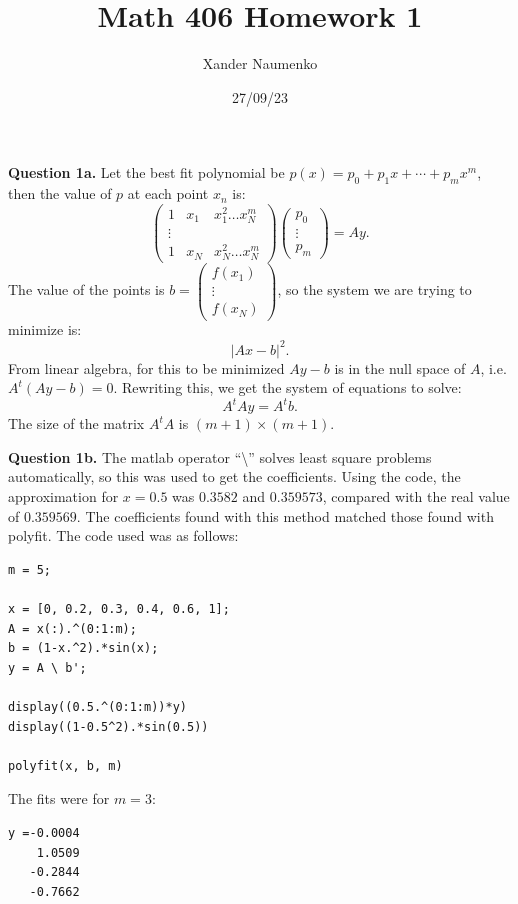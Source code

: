 \documentclass[letterpaper, reqno,11pt]{article}
\begin{document}
\title{Math 406 Homework 1}
\date{27/09/23}
\author{Xander Naumenko}
\maketitle

{\medskip\noindent\bf Question 1a.} Let the best fit polynomial be $p(x)=p_0+p_1x+\cdots+p_mx^{m}$, then the value of $p$ at each point $x_n$ is:
\[
    \begin{pmatrix} 1&x_1&x_1^2\ldots x_N^{m}\\ \vdots\\ 1&x_N&x_N^2\ldots x_N^{m}\end{pmatrix} \begin{pmatrix} p_0\\\vdots \\p_m \end{pmatrix} =Ay
.\]
The value of the points is $b=\begin{pmatrix} f(x_1)\\ \vdots \\f(x_N) \end{pmatrix} $, so the system we are trying to minimize is:
\[
|Ax-b|^2
.\]
From linear algebra, for this to be minimized $Ay-b$ is in the null space of $A$, i.e. $A^{t}(Ay-b)=0$. Rewriting this, we get the system of equations to solve:
\[
A^{t}Ay=A^{t}b
.\]
The size of the matrix $A^{t}A$ is $(m+1)\times (m+1)$.

{\medskip\noindent\bf Question 1b.} The matlab operator ``\textbackslash'' solves least square problems automatically, so this was used to get the coefficients. Using the code, the approximation for $x=0.5$ was $0.3582$ and $0.359573$, compared with the real value of $0.359569$. The coefficients found with this method matched those found with polyfit. The code used was as follows:
\begin{lstlisting}
m = 5;

x = [0, 0.2, 0.3, 0.4, 0.6, 1];
A = x(:).^(0:1:m);
b = (1-x.^2).*sin(x);
y = A \ b';

display((0.5.^(0:1:m))*y)
display((1-0.5^2).*sin(0.5))

polyfit(x, b, m)
\end{lstlisting}

The fits were for $m=3$:

\begin{lstlisting}
y =-0.0004
    1.0509
   -0.2844
   -0.7662
\end{lstlisting}
\end{document}
